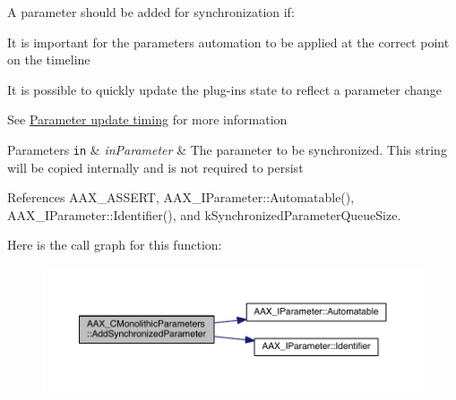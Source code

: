 A parameter should be added for synchronization if\+:
\begin{DoxyItemize}
\item It is important for the parameter\textquotesingle{}s automation to be applied at the correct point on the timeline
\item It is possible to quickly update the plug-\/in\textquotesingle{}s state to reflect a parameter change
\end{DoxyItemize}

See \hyperlink{a00351}{Parameter update timing} for more information


\begin{DoxyParams}[1]{Parameters}
\mbox{\tt in}  & {\em in\+Parameter} & The parameter to be synchronized. This string will be copied internally and is not required to persist \\
\hline
\end{DoxyParams}


References A\+A\+X\+\_\+\+A\+S\+S\+E\+R\+T, A\+A\+X\+\_\+\+I\+Parameter\+::\+Automatable(), A\+A\+X\+\_\+\+I\+Parameter\+::\+Identifier(), and k\+Synchronized\+Parameter\+Queue\+Size.



Here is the call graph for this function\+:
\nopagebreak
\begin{figure}[H]
\begin{center}
\leavevmode
\includegraphics[width=350pt]{a00026_a1b23573e8aa3f8e64c61813b721559c2_cgraph}
\end{center}
\end{figure}


\hypertarget{a00026_a2ebeb6e1cc24277c7e72abbbfbebb5e9}{}
